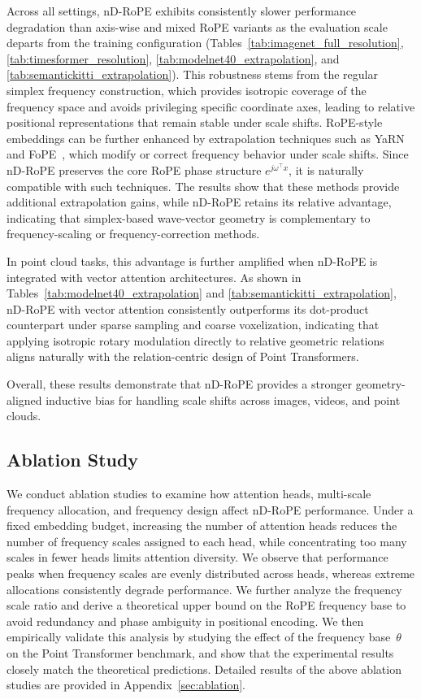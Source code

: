 \documentclass{article}
\theoremstyle{plain}
\theoremstyle{definition}
\theoremstyle{remark}
\begin{document}
Across all settings, nD-RoPE exhibits consistently slower performance degradation than axis-wise and mixed RoPE variants as the evaluation scale departs from the training configuration (Tables~\ref{tab:imagenet_full_resolution}, \ref{tab:timesformer_resolution}, \ref{tab:modelnet40_extrapolation}, and \ref{tab:semantickitti_extrapolation}).
This robustness stems from the regular simplex frequency construction, which provides isotropic coverage of the frequency space and avoids privileging specific coordinate axes, leading to relative positional representations that remain stable under scale shifts. RoPE-style embeddings can be further enhanced by extrapolation techniques such as YaRN~\cite{peng2023yarn} and FoPE~\cite{hua2025fope}, which modify or correct frequency behavior under scale shifts. Since nD-RoPE preserves the core RoPE phase structure $e^{j\omega^\top x}$, it is naturally compatible with such techniques. The results show that these methods provide additional extrapolation gains, while nD-RoPE retains its relative advantage, indicating that simplex-based wave-vector geometry is complementary to frequency-scaling or frequency-correction methods.

In point cloud tasks, this advantage is further amplified when nD-RoPE is integrated with vector attention architectures. As shown in Tables~\ref{tab:modelnet40_extrapolation} and \ref{tab:semantickitti_extrapolation}, nD-RoPE with vector attention consistently outperforms its dot-product counterpart under sparse sampling and coarse voxelization, indicating that applying isotropic rotary modulation directly to relative geometric relations aligns naturally with the relation-centric design of Point Transformers.

Overall, these results demonstrate that nD-RoPE provides a stronger geometry-aligned inductive bias for handling scale shifts across images, videos, and point clouds.

\subsection{Ablation Study}
We conduct ablation studies to examine how attention heads, multi-scale frequency allocation, and frequency design affect nD-RoPE performance. Under a fixed embedding budget, increasing the number of attention heads reduces the number of frequency scales assigned to each head, while concentrating too many scales in fewer heads limits attention diversity. We observe that performance peaks when frequency scales are evenly distributed across heads, whereas extreme allocations consistently degrade performance. We further analyze the frequency scale ratio and derive a theoretical upper bound on the RoPE frequency base to avoid redundancy and phase ambiguity in positional encoding. We then empirically validate this analysis by studying the effect of the frequency base~$\theta$ on the Point Transformer benchmark, and show that the experimental results closely match the theoretical predictions. Detailed results of the above ablation studies are provided in Appendix~\ref{sec:ablation}.
\end{document}
